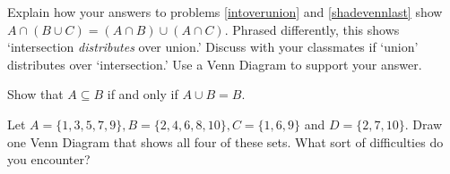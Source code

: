 \documentclass{ximera}
\begin{document}
\begin{question}
\begin{problem}
\begin{multipleChoice}
{\begin{tikzpicture}[scale=0.75]
\end{tikzpicture}}


\end{multipleChoice}
\end{problem}

\end{question}


\begin{problem}
Explain how your answers to problems \ref{intoverunion} and \ref{shadevennlast} show $A \cap (B \cup C) = (A \cap B) \cup (A \cap C)$.  Phrased differently, this shows `intersection \textit{distributes} over union.'  Discuss with your classmates if  `union' distributes over `intersection.'  Use a Venn Diagram to support your answer.
\end{problem}

\begin{problem}
Show that $A \subseteq B$ if and only if $A \cup B = B$.
\end{problem}

\begin{problem}
Let $A = \{1,3,5,7,9\}, B = \{2,4,6,8,10\}, C = \{1,6,9\}$ and $D = \{2,7,10\}$.  Draw one Venn Diagram that shows all four of these sets.  What sort of difficulties do you encounter?  
\end{problem}
\end{document}
